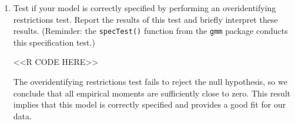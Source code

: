 \documentclass[11pt,letterpaper]{article}
\begin{document}
\begin{enumerate}[label=\alph*., leftmargin=*]
\begin{enumerate}[label=\roman*.]
		\item Test if your model is correctly specified by performing an overidentifying restrictions test. Report the results of this test and briefly interpret these results. (Reminder: the \texttt{specTest()} function from the \texttt{gmm} package conducts this specification test.)

		<<R CODE HERE>>

		The overidentifying restrictions test fails to reject the null hypothesis, so we conclude that all empirical moments are sufficiently close to zero. This result implies that this model is correctly specified and provides a good fit for our data.
	\end{enumerate}
\end{enumerate}
\end{document}
